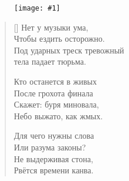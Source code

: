 \documentclass[12pt,a5paper,twoside]{article}
\newcommand{\pict}[1]{\thispagestyle{empty}\begin{figure}[H]\begin{center}\texttt{[image: \#1]}\end{center}\end{figure}\newpage}
\begin{document}
\pict{picts/Net_u_muziki_uma} 
%



\settowidth{\versewidth}{Нет у музыки ума,}
\begin{verse}[\versewidth]
Нет у музыки ума,\\
Чтобы ездить осторожно.\\
Под ударных треск тревожный\\
тела падает тюрьма.

Кто останется в живых\\
После грохота финала\\
Скажет: буря миновала,\\
Небо выжато, как жмых.

Для чего нужны слова\\
Или разума законы?\\
Не выдерживая стона,\\
Рвётся времени канва.

\end{verse}
\newpage
\end{document}
